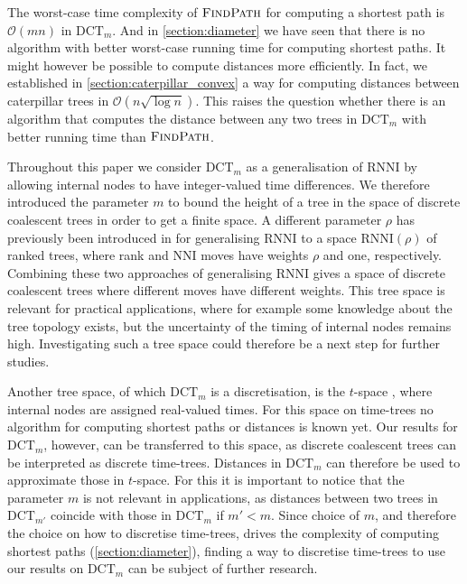 \documentclass[11pt]{amsart}
\newcommand{\rnni}{\mathrm{RNNI}}
\newcommand{\findpath}{\textsc{FindPath}}
\newcommand{\nni}{\mathrm{NNI}}
\newcommand{\dtt}{\mathrm{DCT}}
\renewcommand{\O}{\mathcal O}
\newcommand{\summary}[1]{} %
\begin{document}
\summary{More efficient algorithm for computing distances (not shortest paths)}
The worst-case time complexity of $\findpath$ for computing a shortest path is $\O(mn)$ in $\dtt_m$.
And in \autoref{section:diameter} we have seen that there is no algorithm with better worst-case running time for computing shortest paths.
It might however be possible to compute distances more efficiently.
In fact, we established in \autoref{section:caterpillar_convex} a way for computing distances between caterpillar trees in $\O(n \sqrt{\log n})$.
This raises the question whether there is an algorithm that computes the distance between any two trees in $\dtt_m$ with better running time than $\findpath$.

\summary{$\rnni(rho)$ and parameter $\rho$ for discrete coalescent trees}
Throughout this paper we consider $\dtt_m$ as a generalisation of $\rnni$ by allowing internal nodes to have integer-valued time differences.
We therefore introduced the parameter $m$ to bound the height of a tree in the space of discrete coalescent trees in order to get a finite space.
A different parameter $\rho$ has previously been introduced in \textcite{Collienne2020-iu} for generalising $\rnni$ to a space $\rnni(\rho)$ of ranked trees, where rank and $\nni$ moves have weights $\rho$ and one, respectively.
Combining these two approaches of generalising $\rnni$ gives a space of discrete coalescent trees where different moves have different weights.
This tree space is relevant for practical applications, where for example some knowledge about the tree topology exists, but the uncertainty of the timing of internal nodes remains high.
Investigating such a tree space could therefore be a next step for further studies.

\summary{t-space}
Another tree space, of which $\dtt_m$ is a discretisation, is the $t$-space \autocite{Gavryushkin2016-uu}, where internal nodes are assigned real-valued times.
For this space on time-trees no algorithm for computing shortest paths or distances is known yet.
Our results for $\dtt_m$, however, can be transferred to this space, as discrete coalescent trees can be interpreted as discrete time-trees.
Distances in $\dtt_m$ can therefore be used to approximate those in $t$-space.
For this it is important to notice that the parameter $m$ is not relevant in applications, as distances between two trees in $\dtt_{m'}$ coincide with those in $\dtt_m$ if $m' < m$.
Since choice of $m$, and therefore the choice on how to discretise time-trees, drives the complexity of computing shortest paths (\autoref{section:diameter}), finding a way to discretise time-trees to use our results on $\dtt_m$ can be subject of further research.
\end{document}
